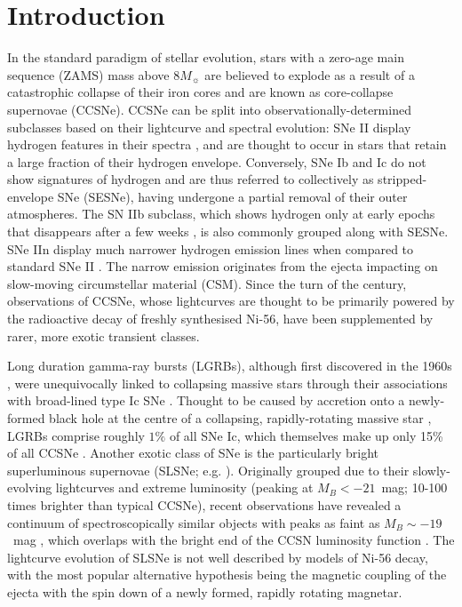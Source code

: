 \documentclass[fleqn,usenatbib,]{mnras}
\newcommand{\replyref}[1]{\color{magenta}#1 \color{black}}
\begin{document}

\replyref{}
\section{Introduction}

In the standard paradigm of stellar evolution, stars with a zero-age main sequence (ZAMS) mass above $8M_{\sun}$ are believed to explode as a result of a catastrophic collapse of their iron cores and are known as core-collapse supernovae (CCSNe). CCSNe can be split into observationally-determined subclasses based on their lightcurve and spectral evolution: SNe II display hydrogen features in their spectra \citep{Minkowski1941}, and are thought to occur in stars that retain a large fraction of their hydrogen envelope. Conversely, SNe Ib and Ic do not show signatures of hydrogen \citep[e.g.][]{Filippenko1997} and are thus referred to collectively as stripped-envelope SNe (SESNe), having undergone a partial removal of their outer atmospheres. The SN IIb subclass, which shows hydrogen only at early epochs that disappears after a few weeks \citep{Filippenko1988}, is also commonly grouped along with SESNe. SNe IIn display much narrower hydrogen emission lines when compared to standard SNe II \citep{Schlegel1990}. The narrow emission originates from the ejecta impacting on slow-moving circumstellar material (CSM). Since the turn of the century, observations of CCSNe, whose lightcurves are \replyref{thought to be} primarily powered by the radioactive decay of freshly synthesised Ni-56, have been supplemented by rarer, more exotic transient classes.

 Long duration gamma-ray bursts (LGRBs), although first discovered in the 1960s \citep{Klebesadel1973}, were unequivocally linked to collapsing massive stars through their associations with broad-lined type Ic SNe \citep{Galama1998,Hjorth2003}. Thought to be caused by accretion onto a newly-formed black hole at the centre of a collapsing, rapidly-rotating massive star \citep[e.g.][]{Woosley1993,Woosley2006a,Woosley2006b}, LGRBs comprise roughly $1\%$ of all SNe Ic, which themselves make up only 15\% of all CCSNe \citep{Kelly2012,Graham2016}. Another exotic class of SNe is the particularly bright superluminous supernovae (SLSNe; e.g. \citealt{Quimby2011, Gal-Yam2012}). Originally grouped due to their slowly-evolving lightcurves and extreme luminosity (peaking at $M_B < -21$~mag; 10-100 times brighter than typical CCSNe), recent observations have revealed a continuum of spectroscopically similar objects with peaks as faint as $M_B \sim -19$~mag \citep{DeCia2018,Lunnan2018,Angus2019}, which overlaps with the bright end of the CCSN luminosity function \citep{Li2011}. The lightcurve evolution of SLSNe is not well described by models of Ni-56 decay, with the most popular alternative hypothesis being the magnetic coupling of the ejecta with the spin down of a newly formed, rapidly rotating magnetar.
 
\end{document}
